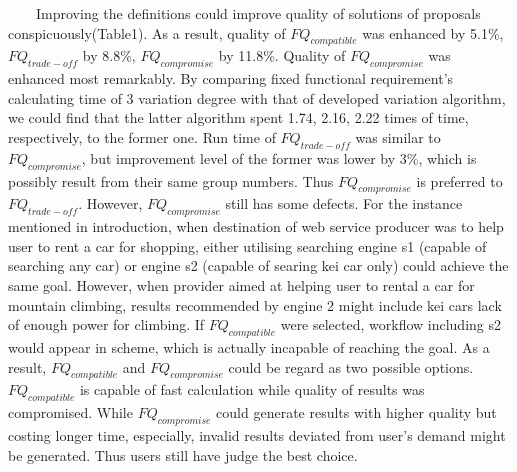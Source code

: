 \documentclass[senior,final,11pt]{iscs-thesis}
\begin{document}
~~~~Improving the definitions could improve quality of solutions of proposals conspicuously(Table1). As a result, quality of $FQ_{compatible}$ was enhanced by 5.1\%, $FQ_{trade-off}$ by 8.8\%, $FQ_{compromise}$ by 11.8\%. Quality of $FQ_{compromise}$ was enhanced most remarkably. By comparing fixed functional requirement’s calculating time of 3 variation degree with that of developed variation algorithm, we could find that the latter algorithm spent 1.74, 2.16, 2.22 times of time, respectively, to the former one. Run time of $FQ_{trade-off}$ was similar to $FQ_{compromise}$, but improvement level of the former was lower by 3\%, which is possibly result from their same group numbers. Thus $FQ_{compromise}$ is preferred to $FQ_{trade-off}$. However, $FQ_{compromise}$ still has some defects. For the instance mentioned in introduction, when destination of web service producer was to help user to rent a car for shopping, either utilising searching engine s1 (capable of searching any car) or engine s2 (capable of searing kei car only) could achieve the same goal. However, when provider aimed at helping user to rental a car for mountain climbing, results recommended by engine 2 might include kei cars lack of enough power for climbing. If $FQ_{compatible}$ were selected, workflow including s2 would appear in scheme, which is actually incapable of reaching the goal. As a result, $FQ_{compatible}$ and $FQ_{compromise}$ could be regard as two possible options. $FQ_{compatible}$ is capable of fast calculation while quality of results was compromised.  While $FQ_{compromise}$ could generate results with higher quality but costing longer time, especially, invalid results deviated from user’s demand might be generated. Thus users still have judge the best choice. 
\end{document}
